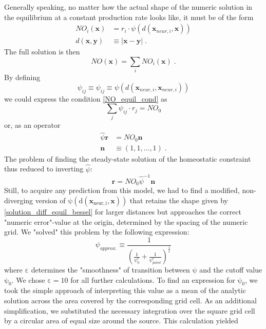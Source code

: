 \documentclass[10pt,a4paper]{article}
\begin{document}
Generally speaking, no matter how the actual shape of the numeric solution in the equilibrium at a constant production rate looks like, it must be of the form
\begin{align}
NO_i(\mathbf{x}) &= r_i \cdot \psi (d(\mathbf{x}_{neur,i},\mathbf{x})) \label{general_diff_interaction} \\
d(\mathbf{x},\mathbf{y}) &\equiv |\mathbf{x}-\mathbf{y}| \; . \label{eucl_dist}
\end{align}
The full solution is then
\begin{equation}
NO(\mathbf{x}) = \sum_i NO_i(\mathbf{x})\;.
\label{full_sol_diff_equil}
\end{equation}
By defining
\begin{equation}
\psi_{ij} \equiv \psi_{ij} \equiv \psi (d(\mathbf{x}_{neur,i},\mathbf{x}_{neur,i}))
\label{interact_matrix_elements}
\end{equation}
we could express the condition \eqref{NO_equil_cond} as
\begin{equation}
\sum_j \psi_{ij}\cdot r_j = NO_0
\label{NO_equil_cond_interact_matrix}
\end{equation}
or, as an operator
\begin{align}
\hat{\psi}\mathbf{r} &= NO_0 \mathbf{n} \label{NO_equil_cond_interact_matrix_operator} \\
\mathbf{n}&\equiv (1,1,...,1) \; .
\end{align}
The problem of finding the steady-state solution of the homeostatic constraint thus reduced to inverting $\hat{\psi}$:
\begin{equation}
\mathbf{r} = NO_0 \hat{\psi}^{-1} \mathbf{n}
\label{NO_euqil_cond_interact_matrix_operator_solve}
\end{equation}
Still, to acquire any prediction from this model, we had to find a modified, non-diverging version of $\mathrm{\psi (d(\mathbf{x}_{neur,i},\mathbf{x}))}$ that retains the shape given by \eqref{solution_diff_equil_bessel} for larger distances but approaches the correct "numeric error"-value at the origin, determined by the spacing of the numeric grid. We "solved" this problem by the following expression:
\begin{equation}
\psi_{approx.} \equiv \frac{1}{\left(\frac{1}{\psi_0^\varepsilon} + \frac{1}{\psi_{point}^\varepsilon}\right)^{\frac{1}{\varepsilon}}}
\label{Numeric_Solution_Expression_Trick}
\end{equation}
where $\mathrm{\varepsilon}$ determines the "smoothness" of transition between $\mathrm{\psi}$ and the cutoff value $\mathrm{\psi_0}$. We chose $\mathrm{\varepsilon=10}$ for all further calculations. To find an expression for $\mathrm{\psi_0}$, we took the simple approach of interpreting this value as a mean of the analytic solution across the area covered by the corresponding grid cell. As an additional simplification, we substituted the necessary integration over the square grid cell by a circular area of equal size around the source. This calculation yielded
\end{document}
